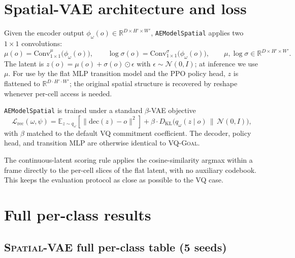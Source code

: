 \documentclass{article}
\newcommand{\encVQGoal}{\textsc{VQ-Goal}}
\newcommand{\encSpatialVAE}{\textsc{Spatial-VAE}}
\begin{document}
\section{Spatial-VAE architecture and loss}\label{app:vae-spatial}

Given the encoder output $\phi_\omega(o) \in \mathbb{R}^{D \times H' \times W'}$, \texttt{AEModelSpatial} applies two $1 \times 1$ convolutions:
\begin{equation}
  \mu(o) = \mathrm{Conv}_{1\times 1}^\mu\big(\phi_\omega(o)\big), \qquad
  \log\sigma(o) = \mathrm{Conv}_{1\times 1}^\sigma\big(\phi_\omega(o)\big), \qquad
  \mu, \log\sigma \in \mathbb{R}^{D \times H' \times W'}.
\end{equation}
The latent is $z(o) = \mu(o) + \sigma(o) \odot \epsilon$ with $\epsilon \sim \mathcal{N}(0, I)$; at inference we use $\mu$. For use by the flat MLP transition model and the PPO policy head, $z$ is flattened to $\mathbb{R}^{D \cdot H' \cdot W'}$; the original spatial structure is recovered by reshape whenever per-cell access is needed.

\texttt{AEModelSpatial} is trained under a standard $\beta$-VAE objective
\begin{equation}
  \mathcal{L}_{\text{rec}}(\omega, \psi) = \mathbb{E}_{z \sim q_\omega}[\|\mathrm{dec}(z) - o\|^2] + \beta \cdot D_{\text{KL}}\big(q_\omega(z \mid o) \,\|\, \mathcal{N}(0, I)\big),
\end{equation}
with $\beta$ matched to the default VQ commitment coefficient. The decoder, policy head, and transition MLP are otherwise identical to \encVQGoal.

The continuous-latent scoring rule applies the cosine-similarity argmax within a frame directly to the per-cell slices of the flat latent, with no auxiliary codebook. This keeps the evaluation protocol as close as possible to the VQ case.

\section{Full per-class results}\label{app:full-tables}

\subsection{\encSpatialVAE{} full per-class table (5 seeds)}
\end{document}
